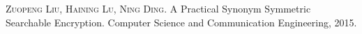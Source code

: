 
\begin{publications}{99}

      
      \item\textsc{Zuopeng Liu, Haining Lu, Ning Ding}. {A Practical Synonym Symmetric Searchable Encryption}.
      Computer Science and Communication Engineering, 2015.


\end{publications}
